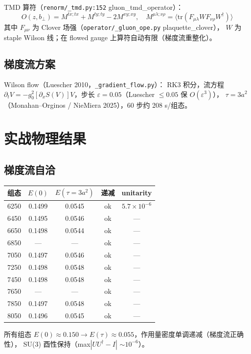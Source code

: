 \documentclass[11pt]{article}
\begin{document}
TMD 算符（\texttt{renorm/\_tmd.py:152} gluon\_tmd\_operator）：
\[
O(z,b_\perp)=M^{tx;tx}+M^{ty;ty}-2M^{xy;xy},\quad
M^{\mu\lambda;\nu\rho}=\langle \mathrm{tr}(F_{\mu\lambda} W F_{\nu\rho} W^\dagger)\rangle
\]
其中 $F_{\mu\nu}$ 为 Clover 场强（\texttt{operator/\_gluon\_ope.py} plaquette\_clover），
$W$ 为 staple Wilson 线；在 flowed gauge 上算符自动有限（梯度流重整化）。

\subsection{梯度流方案}
Wilson flow（Luescher 2010，\texttt{\_gradient\_flow.py}）：
RK3 积分，流方程 $\partial_t V=-g_0^2[\partial_x S(V)]V$，步长
$\varepsilon=0.05$（Luescher $\le0.05$ 保 $O(\varepsilon^3)$），
$\tau=3a^2$（Monahan--Orginos / NieMiera 2025），60 步约 208 s/组态。

\section{实战物理结果}
\subsection{梯度流自洽}
\begin{center}
\begin{tabular}{lcccc}
\hline
组态 & $E(0)$ & $E(\tau=3a^2)$ & 递减 & unitarity \\
\hline
6250 & 0.1499 & 0.0545 & ok & $5.7\times10^{-6}$ \\
6450 & 0.1495 & 0.0546 & ok & --- \\
6650 & 0.1498 & 0.0544 & ok & --- \\
6850 & --- & --- & ok & --- \\
7050 & 0.1497 & 0.0546 & ok & --- \\
7250 & 0.1498 & 0.0548 & ok & --- \\
7450 & 0.1498 & 0.0548 & ok & --- \\
7650 & --- & --- & ok & --- \\
7850 & 0.1497 & 0.0548 & ok & --- \\
8050 & 0.1496 & 0.0545 & ok & --- \\
\hline
\end{tabular}
\end{center}
所有组态 $E(0)\approx0.150\to E(\tau)\approx0.055$，作用量密度单调递减（梯度流正确性），
SU(3) 酉性保持（max$|UU^\dagger-I|$ $\sim 10^{-6}$）。
\end{document}
